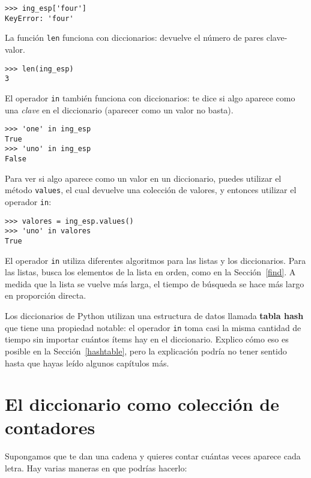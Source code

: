 \documentclass[10pt]{book}
\begin{document}
\begin{verbatim}
>>> ing_esp['four']
KeyError: 'four'
\end{verbatim}
%
La función {\tt len} funciona con diccionarios: devuelve el
número de pares clave-valor.

\begin{verbatim}
>>> len(ing_esp)
3
\end{verbatim}
%
El operador {\tt in} también funciona con diccionarios: te dice si
algo aparece como una {\em clave} en el diccionario (aparecer
como un valor no basta).

\begin{verbatim}
>>> 'one' in ing_esp
True
>>> 'uno' in ing_esp
False
\end{verbatim}
%
Para ver si algo aparece como un valor en un diccionario,
puedes utilizar el método {\tt values}, el cual devuelve una colección de
valores, y entonces utilizar el operador {\tt in}:

\begin{verbatim}
>>> valores = ing_esp.values()
>>> 'uno' in valores
True
\end{verbatim}
%
El operador {\tt in} utiliza diferentes algoritmos para las listas y los
diccionarios.  Para las listas, busca los elementos de la lista en
orden, como en la Sección~\ref{find}.  A medida que la lista se vuelve más larga,
el tiempo de búsqueda se hace más largo en proporción directa.

Los diccionarios de Python utilizan una estructura de datos
llamada {\bf tabla hash} que tiene una propiedad notable: el
operador {\tt in} toma casi la misma cantidad de tiempo sin importar
cuántos ítems hay en el diccionario.  Explico cómo eso es posible
en la Sección~\ref{hashtable}, pero la explicación podría no tener
sentido hasta que hayas leído algunos capítulos más.


\section{El diccionario como colección de contadores}
\label{histogram}

Supongamos que te dan una cadena y quieres contar cuántas
veces aparece cada letra.  Hay varias maneras en que podrías hacerlo:
\end{document}
